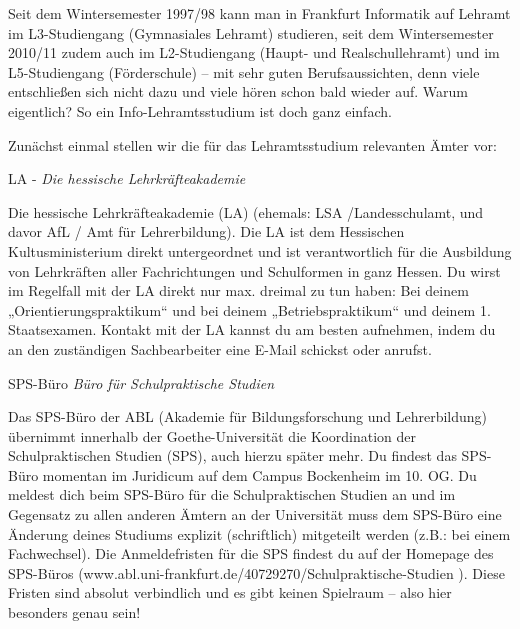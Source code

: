 \spaltenanfang
Seit dem Wintersemester 1997/98 kann man in Frankfurt Informatik auf Lehramt im L3-Studiengang (Gymnasiales Lehramt) studieren, seit dem Wintersemester 2010/11 zudem auch im L2-Studiengang (Haupt- und Realschullehramt) und im L5-Studiengang (Förderschule)  – mit sehr guten Berufsaussichten, denn viele entschließen sich nicht dazu und viele hören schon bald wieder auf.
Warum eigentlich? So ein Info-Lehramtsstudium ist doch ganz einfach.

Zunächst einmal stellen wir die für das Lehramtsstudium relevanten Ämter vor:

LA - \textit{Die hessische Lehrkräfteakademie}

Die hessische Lehrkräfteakademie (LA) (ehemals: LSA /Landesschulamt, und davor AfL / Amt für Lehrerbildung).
Die LA ist dem Hessischen Kultusministerium direkt untergeordnet und ist verantwortlich für die Ausbildung von Lehrkräften aller Fachrichtungen und Schulformen in ganz Hessen.
Du wirst im Regelfall mit der LA direkt nur max. dreimal zu tun haben: Bei deinem „Orientierungspraktikum“ und bei deinem „Betriebspraktikum“ und deinem 1. Staatsexamen.
Kontakt mit der LA kannst du am besten aufnehmen, indem du an den zuständigen Sachbearbeiter eine E-Mail schickst oder anrufst.


SPS-Büro \textit{Büro für Schulpraktische Studien}

Das SPS-Büro der ABL (Akademie für Bildungsforschung und Lehrerbildung) übernimmt innerhalb der Goethe-Universität die Koordination der Schulpraktischen Studien (SPS), auch hierzu später mehr. Du findest das SPS-Büro momentan im Juridicum auf dem Campus Bockenheim im 10. OG.
Du meldest dich beim SPS-Büro für die Schulpraktischen Studien an und im Gegensatz zu allen anderen Ämtern an der Universität muss dem SPS-Büro eine Änderung deines Studiums explizit (schriftlich) mitgeteilt werden (z.B.: bei einem Fachwechsel). Die Anmeldefristen für die SPS findest du auf der Homepage des SPS-Büros (www.abl.uni-frankfurt.de/40729270/Schulpraktische-Studien ). Diese Fristen sind absolut verbindlich und es gibt keinen Spielraum – also hier besonders genau sein!


